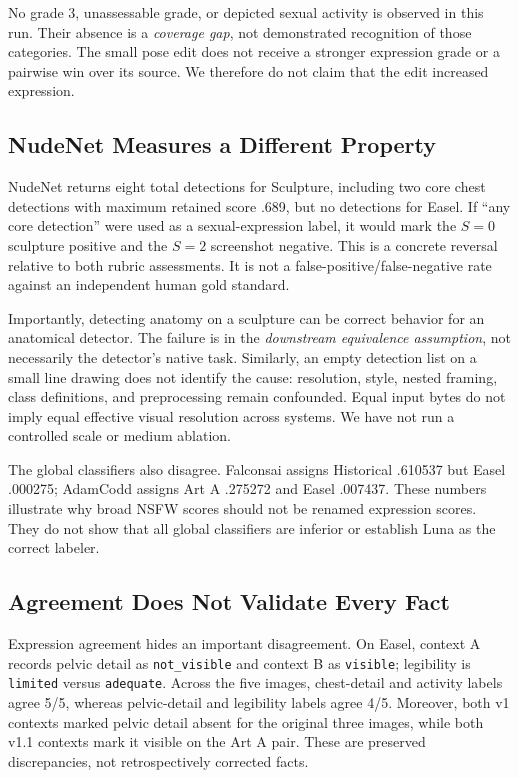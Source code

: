\documentclass[11pt]{article}
\begin{document}
No grade 3, unassessable grade, or depicted sexual activity is observed in this run. Their absence is a \emph{coverage gap}, not demonstrated recognition of those categories. The small pose edit does not receive a stronger expression grade or a pairwise win over its source. We therefore do not claim that the edit increased expression.

\subsection{NudeNet Measures a Different Property}
NudeNet returns eight total detections for Sculpture, including two core chest detections with maximum retained score .689, but no detections for Easel. If ``any core detection'' were used as a sexual-expression label, it would mark the $S=0$ sculpture positive and the $S=2$ screenshot negative. This is a concrete reversal relative to both rubric assessments. It is not a false-positive/false-negative rate against an independent human gold standard.

Importantly, detecting anatomy on a sculpture can be correct behavior for an anatomical detector. The failure is in the \emph{downstream equivalence assumption}, not necessarily the detector's native task. Similarly, an empty detection list on a small line drawing does not identify the cause: resolution, style, nested framing, class definitions, and preprocessing remain confounded. Equal input bytes do not imply equal effective visual resolution across systems. We have not run a controlled scale or medium ablation.

The global classifiers also disagree. Falconsai assigns Historical .610537 but Easel .000275; AdamCodd assigns Art A .275272 and Easel .007437. These numbers illustrate why broad NSFW scores should not be renamed expression scores. They do not show that all global classifiers are inferior or establish Luna as the correct labeler.

\subsection{Agreement Does Not Validate Every Fact}
Expression agreement hides an important disagreement. On Easel, context A records pelvic detail as \texttt{not\_visible} and context B as \texttt{visible}; legibility is \texttt{limited} versus \texttt{adequate}. Across the five images, chest-detail and activity labels agree 5/5, whereas pelvic-detail and legibility labels agree 4/5. Moreover, both v1 contexts marked pelvic detail absent for the original three images, while both v1.1 contexts mark it visible on the Art A pair. These are preserved discrepancies, not retrospectively corrected facts.
\end{document}

